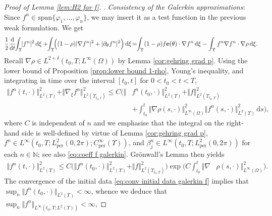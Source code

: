 \documentclass[11pt,a4paper,reqno]{amsart}
\theoremstyle{remark}
\theoremstyle{definition}
\numberwithin{equation}{section}
\newcommand{\per}{\mathrm{per}}
\newcommand{\e}{{\bf e}}
\newcommand{\bxi}{\xi}
\renewcommand{\d}{\, \mathrm{d} }
\newcommand{\der}{\mathrm{d}}
\begin{document}
\begin{proof}[Proof of Lemma \ref{lem:H2 for f}]
 . \textit{Consistency of the Galerkin approximations}: Since $f^n \in \mathrm{span}\{\varphi_1,\dots,\varphi_n\}$, we may insert it as a test function in the previous weak formulation. We get 
 \begin{equation*}
     \frac{1}{2}\frac{\der}{\der t}\!\!\int_\Upsilon\!\! |f^n|^2 \d \bxi +\!\! \int_\Upsilon\!\! \Big( (1-\rho)|\nabla f^n|^2 + |\partial_\theta f^n|^2 \Big) \d \bxi \!=\!\! \int_\Upsilon (1-\rho)f \e(\theta) \cdot \nabla f^n \d \bxi - \int_\Upsilon f^n \nabla f^n \cdot \nabla \rho \d \bxi. 
 \end{equation*}
 Recall $\nabla \rho \in L^{2+\delta}(t_0,T;L^\infty(\Omega))$ by Lemma \ref{cor:gehring grad p}. Using the lower bound of Proposition \ref{prop:lower bound 1-rho}, Young's inequality, and integrating in time over the interval $[t_0,t]$ for $0<t_0<t<T$, 
   \begin{equation}\label{eq:galerkin f h1 est}
     \begin{aligned}
            \Vert f^n(t,\cdot)\Vert_{L^2(\Upsilon)}^2 + \Vert \nabla_{\bxi} f^n \Vert_{L^2(\Upsilon_{t_0,t})}^2 \leq C \Big(  \Vert & f^n(t_0,\cdot)\Vert_{L^2(\Upsilon)}^2 + \Vert f  \Vert_{L^2(\Upsilon_{t_0,T})}^2 \\ 
            &+ 
 \int_{t_0}^t  \Vert\nabla \rho(s,\cdot)\Vert^2_{L^\infty(\Omega)} \Vert f^n(s,\cdot)\Vert_{L^2(\Upsilon)}^2 \d s \Big), 
     \end{aligned}
 \end{equation}
where $C$ is independent of $n$ and we emphasise that the integral on the right-hand side is well-defined by virtue of Lemma \ref{cor:gehring grad p}, $f^n \in L^\infty(t_0,T;L^2_\per(0,2\pi);C^\infty_\per(\Upsilon))$, and $\beta^n_j \in L^\infty(t_0,T;L^2_\per(0,2\pi))$ for each $n\in\mathbb{N}$; see also \eqref{eq:coeff f galerkin}. Gr\"onwall's Lemma then yields 
  \begin{equation*}
     \begin{aligned}
            \Vert f^n(t,\cdot)\Vert_{L^2(\Upsilon)}^2 \leq C \Big(  \Vert f^n(t_0,\cdot)\Vert_{L^2(\Upsilon)}^2 + \Vert f \Vert_{L^2(\Upsilon_{t_0,T})}^2 \Big) \exp\Big( C \int_{t_0}^t\Vert\nabla & \rho(s,\cdot)\Vert^2_{L^\infty(\Omega)} \Big). 
     \end{aligned}
 \end{equation*}
The convergence of the initial data \eqref{eq:conv initial data galerkin f} implies that $\sup_n \Vert f^n(t_0,\cdot) \Vert_{L^2(\Upsilon)} < \infty$, whence we deduce that $\sup_n \Vert f^n \Vert_{L^\infty(t_0,T;L^2(\Upsilon))} < \infty$,

\end{proof}
\end{document}
